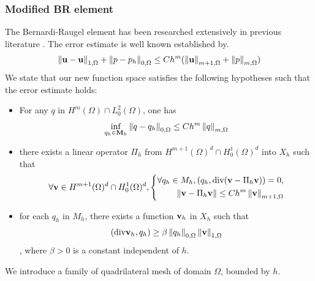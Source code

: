 \subsubsection{Modified BR element}

The Bernardi-Raugel element has been researched extensively in previous 
literature \cite{AnalysisFiniteElemStokes_Bernardi_Raugel}. 
The error estimate is well known established by\cite{FinElemMethNavierStokes}.
\begin{equation}
\left\lVert \bold{u} - \bold{u} \right\rVert_{1,\Omega} + 
\left\lVert p-p_h \right\rVert_{0,\Omega} \leq Ch^{m}(\left\lVert \bold{u} \right\rVert_{m+1,\Omega} + \left\lVert p \right\rVert_{m,\Omega})
\end{equation}
We state that our new function space satisfies the following hypotheses such that the
error estimate holds:
\begin{itemize}
		  \item For any $q$ in $H^m(\Omega) \cap L_0^2(\Omega)$, one has
		  $$\inf_{q_h \in \bold{M}_h} \left\lVert q-q_h \right\rVert_{0,\Omega} \leq Ch^m \left\lVert q \right\rVert_{m,\Omega}$$
		  \item there exists a linear operator $\Pi_h$ from 
		  $H^{m+1}(\Omega)^d \cap H_0^1(\Omega)^d$ into $X_h$ such that
		  $$\forall \bold{v}\in H^{m+1}(\Omega)^d \cap H^1_0(\Omega)^d, \left \{ \begin{aligned}
\forall q_h \in M_h, (q_h, \text{div}(\bold{v} - \Pi_h\bold{v})) = 0,\\
\left\lVert \bold{v} - \Pi_h{\bold{v}} \right\rVert \leq Ch^m\left\lVert \bold{v} \right\rVert_{m+1,\Omega}
		  \end{aligned}\right .$$
		  \item for each $q_h$ in $M_h$, there exists a function $\bold{v}_h$ in $X_h$ such that
		  $$(\text{div} \bold{v}_h, q_h) \geq \beta \left\lVert q_h \right\rVert_{0,\Omega}\left\lVert \bold{v} \right\rVert_{1,\Omega}$$,
		  where $\beta > 0$ is a constant independent of $h$.
\end{itemize}
We introduce a family of quadrilateral mesh of domain $\Omega$, bounded by $h$.


